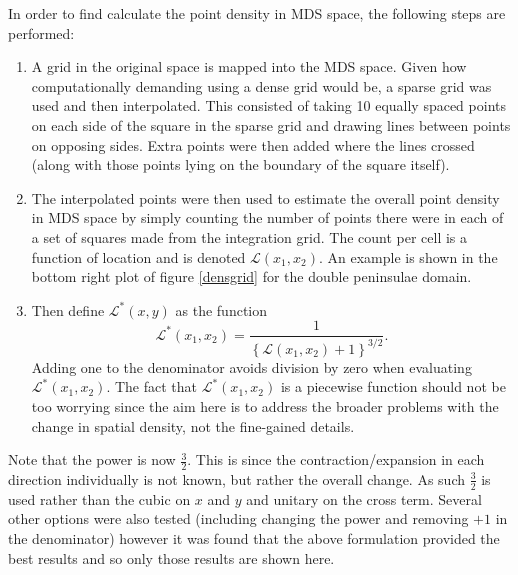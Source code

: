 In order to find calculate the point density in MDS space, the following steps are performed:
\begin{enumerate}
\item A grid in the original space is mapped into the MDS space. Given how computationally demanding using a dense grid would be, a sparse grid was used and then interpolated. This consisted of taking 10 equally spaced points on each side of the square in the sparse grid and drawing lines between points on opposing sides. Extra points were then added where the lines crossed (along with those points lying on the boundary of the square itself).
\item The interpolated points were then used to estimate the overall point density in MDS space by simply counting the number of points there were in each of a set of squares made from the integration grid. The count per cell is a function of location and is denoted $\mathcal{L}(x_1,x_2)$. An example is shown in the bottom right plot of figure \ref{densgrid} for the double peninsulae domain. 
\item Then define $\mathcal{L}^*(x,y)$ as the function
\begin{equation*}
\mathcal{L}^*(x_1,x_2)=\frac{1}{ \left \{\mathcal{L}(x_1,x_2) +1 \right \}^{3/2}}.
\end{equation*}
\label{cor-4s9}Adding one to the denominator avoids division by zero when evaluating $\mathcal{L}^*(x_1,x_2)$. The fact that $\mathcal{L}^*(x_1,x_2)$ is a piecewise function should not be too worrying since the aim here is to address the broader problems with the change in spatial density, not the fine-gained details.
\end{enumerate}

Note that the power is now $\frac{3}{2}$. This is since the contraction/expansion in each direction individually is not known, but rather the overall change. As such $\frac{3}{2}$ is used rather than the cubic on $x$ and $y$ and unitary on the cross term. Several other options were also tested (including changing the power and removing $+1$ in the denominator) however it was found that the above formulation provided the best results and so only those results are shown here.

